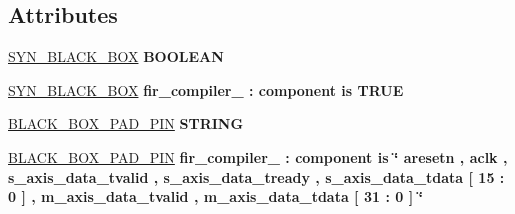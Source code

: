 \subsection*{Attributes}
 \begin{DoxyCompactItemize}
\item 
\hypertarget{class_a_d_c___t_o_p_1_1_behavioral_a620a472e1e38a9a065c13709be3c3498}{\hyperlink{class_a_d_c___t_o_p_1_1_behavioral_a620a472e1e38a9a065c13709be3c3498}{S\-Y\-N\-\_\-\-B\-L\-A\-C\-K\-\_\-\-B\-O\-X} {\bfseries \textcolor{comment}{B\-O\-O\-L\-E\-A\-N}\textcolor{vhdlchar}{ }} }\label{class_a_d_c___t_o_p_1_1_behavioral_a620a472e1e38a9a065c13709be3c3498}

\item 
\hypertarget{class_a_d_c___t_o_p_1_1_behavioral_a454ef7ac14ff89d841d879c15457fe37}{\hyperlink{class_a_d_c___t_o_p_1_1_behavioral_a454ef7ac14ff89d841d879c15457fe37}{S\-Y\-N\-\_\-\-B\-L\-A\-C\-K\-\_\-\-B\-O\-X} {\bfseries \textcolor{vhdlchar}{fir\-\_\-compiler\-\_}\textcolor{vhdlchar}{ }\textcolor{vhdlchar}{\-:}\textcolor{vhdlchar}{ }\textcolor{vhdlkeyword}{component}\textcolor{vhdlchar}{ }\textcolor{vhdlkeyword}{is}\textcolor{vhdlchar}{ }\textcolor{vhdlchar}{T\-R\-U\-E}\textcolor{vhdlchar}{ }} }\label{class_a_d_c___t_o_p_1_1_behavioral_a454ef7ac14ff89d841d879c15457fe37}

\item 
\hypertarget{class_a_d_c___t_o_p_1_1_behavioral_a85263acf3fd8cc44f8fccf0d7c5e1c7d}{\hyperlink{class_a_d_c___t_o_p_1_1_behavioral_a85263acf3fd8cc44f8fccf0d7c5e1c7d}{B\-L\-A\-C\-K\-\_\-\-B\-O\-X\-\_\-\-P\-A\-D\-\_\-\-P\-I\-N} {\bfseries \textcolor{comment}{S\-T\-R\-I\-N\-G}\textcolor{vhdlchar}{ }} }\label{class_a_d_c___t_o_p_1_1_behavioral_a85263acf3fd8cc44f8fccf0d7c5e1c7d}

\item 
\hypertarget{class_a_d_c___t_o_p_1_1_behavioral_a4f5d433d68e79f15dd7eead633de90a3}{\hyperlink{class_a_d_c___t_o_p_1_1_behavioral_a4f5d433d68e79f15dd7eead633de90a3}{B\-L\-A\-C\-K\-\_\-\-B\-O\-X\-\_\-\-P\-A\-D\-\_\-\-P\-I\-N} {\bfseries \textcolor{vhdlchar}{fir\-\_\-compiler\-\_}\textcolor{vhdlchar}{ }\textcolor{vhdlchar}{\-:}\textcolor{vhdlchar}{ }\textcolor{vhdlkeyword}{component}\textcolor{vhdlchar}{ }\textcolor{vhdlkeyword}{is}\textcolor{vhdlchar}{ }\textcolor{keyword}{\char`\"{} aresetn , aclk , s\-\_\-axis\-\_\-data\-\_\-tvalid , s\-\_\-axis\-\_\-data\-\_\-tready , s\-\_\-axis\-\_\-data\-\_\-tdata \mbox{[} 15 \-: 0 \mbox{]} , m\-\_\-axis\-\_\-data\-\_\-tvalid , m\-\_\-axis\-\_\-data\-\_\-tdata \mbox{[} 31 \-: 0 \mbox{]} \char`\"{}}\textcolor{vhdlchar}{ }} }\label{class_a_d_c___t_o_p_1_1_behavioral_a4f5d433d68e79f15dd7eead633de90a3}

\end{DoxyCompactItemize}
